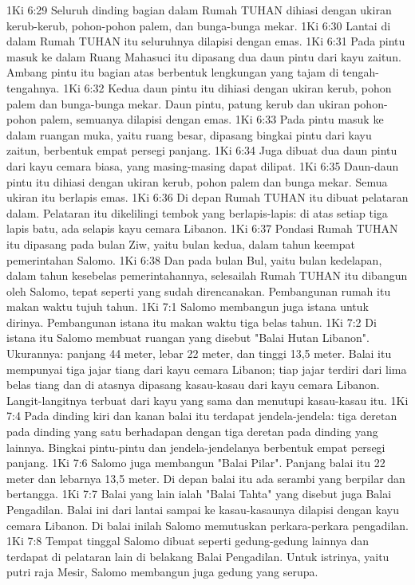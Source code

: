 1Ki 6:29  Seluruh dinding bagian dalam Rumah TUHAN dihiasi dengan ukiran kerub-kerub, pohon-pohon palem, dan bunga-bunga mekar.
1Ki 6:30  Lantai di dalam Rumah TUHAN itu seluruhnya dilapisi dengan emas.
1Ki 6:31  Pada pintu masuk ke dalam Ruang Mahasuci itu dipasang dua daun pintu dari kayu zaitun. Ambang pintu itu bagian atas berbentuk lengkungan yang tajam di tengah-tengahnya.
1Ki 6:32  Kedua daun pintu itu dihiasi dengan ukiran kerub, pohon palem dan bunga-bunga mekar. Daun pintu, patung kerub dan ukiran pohon-pohon palem, semuanya dilapisi dengan emas.
1Ki 6:33  Pada pintu masuk ke dalam ruangan muka, yaitu ruang besar, dipasang bingkai pintu dari kayu zaitun, berbentuk empat persegi panjang.
1Ki 6:34  Juga dibuat dua daun pintu dari kayu cemara biasa, yang masing-masing dapat dilipat.
1Ki 6:35  Daun-daun pintu itu dihiasi dengan ukiran kerub, pohon palem dan bunga mekar. Semua ukiran itu berlapis emas.
1Ki 6:36  Di depan Rumah TUHAN itu dibuat pelataran dalam. Pelataran itu dikelilingi tembok yang berlapis-lapis: di atas setiap tiga lapis batu, ada selapis kayu cemara Libanon.
1Ki 6:37  Pondasi Rumah TUHAN itu dipasang pada bulan Ziw, yaitu bulan kedua, dalam tahun keempat pemerintahan Salomo.
1Ki 6:38  Dan pada bulan Bul, yaitu bulan kedelapan, dalam tahun kesebelas pemerintahannya, selesailah Rumah TUHAN itu dibangun oleh Salomo, tepat seperti yang sudah direncanakan. Pembangunan rumah itu makan waktu tujuh tahun.
1Ki 7:1  Salomo membangun juga istana untuk dirinya. Pembangunan istana itu makan waktu tiga belas tahun.
1Ki 7:2  Di istana itu Salomo membuat ruangan yang disebut "Balai Hutan Libanon". Ukurannya: panjang 44 meter, lebar 22 meter, dan tinggi 13,5 meter. Balai itu mempunyai tiga jajar tiang dari kayu cemara Libanon; tiap jajar terdiri dari lima belas tiang dan di atasnya dipasang kasau-kasau dari kayu cemara Libanon. Langit-langitnya terbuat dari kayu yang sama dan menutupi kasau-kasau itu.
1Ki 7:4  Pada dinding kiri dan kanan balai itu terdapat jendela-jendela: tiga deretan pada dinding yang satu berhadapan dengan tiga deretan pada dinding yang lainnya. Bingkai pintu-pintu dan jendela-jendelanya berbentuk empat persegi panjang.
1Ki 7:6  Salomo juga membangun "Balai Pilar". Panjang balai itu 22 meter dan lebarnya 13,5 meter. Di depan balai itu ada serambi yang berpilar dan bertangga.
1Ki 7:7  Balai yang lain ialah "Balai Tahta" yang disebut juga Balai Pengadilan. Balai ini dari lantai sampai ke kasau-kasaunya dilapisi dengan kayu cemara Libanon. Di balai inilah Salomo memutuskan perkara-perkara pengadilan.
1Ki 7:8  Tempat tinggal Salomo dibuat seperti gedung-gedung lainnya dan terdapat di pelataran lain di belakang Balai Pengadilan. Untuk istrinya, yaitu putri raja Mesir, Salomo membangun juga gedung yang serupa.
